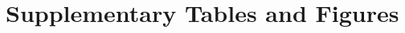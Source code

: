 \documentclass[utf8]{frontiers_suppmat} %
\begin{document}








\section{Supplementary Tables and Figures}






%


\end{document}
